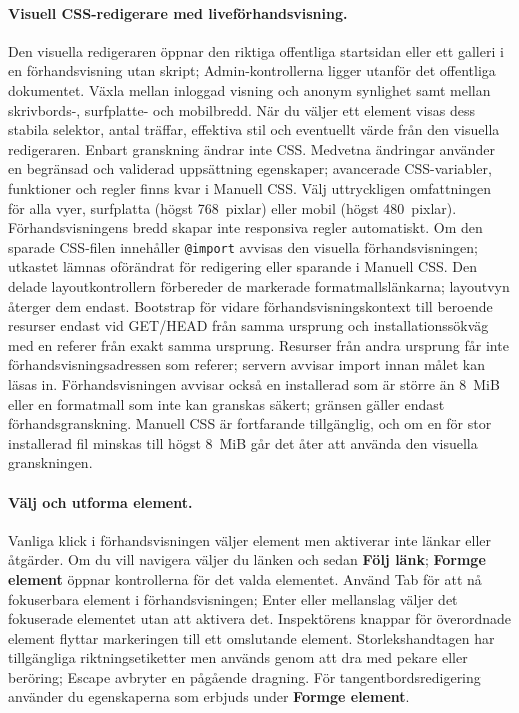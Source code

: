 \documentclass[11pt,a4paper]{article}
\newcommand{\filepath}[1]{\path{#1}}
\newcommand{\ui}[1]{\textbf{#1}}
\newcommand{\codeword}[1]{\nolinkurl{#1}}
\begin{document}
\paragraph{Visuell CSS-redigerare med liveförhandsvisning.} Den visuella
redigeraren öppnar den riktiga offentliga startsidan eller ett galleri i en
förhandsvisning utan skript; Admin-kontrollerna ligger utanför det offentliga
dokumentet. Växla mellan inloggad visning och anonym synlighet samt mellan
skrivbords-, surfplatte- och mobilbredd. När du väljer ett element visas dess
stabila selektor, antal träffar, effektiva stil och eventuellt värde från den
visuella redigeraren. Enbart granskning ändrar inte CSS. Medvetna ändringar
använder en begränsad och validerad uppsättning egenskaper; avancerade
CSS-variabler, funktioner och regler finns kvar i Manuell CSS. Välj uttryckligen
omfattningen för alla vyer, surfplatta (högst 768~pixlar) eller mobil (högst
480~pixlar). Förhandsvisningens bredd skapar inte responsiva regler automatiskt.
Om den sparade CSS-filen innehåller \codeword{@import} avvisas den visuella
förhandsvisningen; utkastet lämnas oförändrat för redigering eller sparande i
Manuell CSS. Den delade layoutkontrollern förbereder de markerade
formatmallslänkarna; layoutvyn återger dem endast. Bootstrap för vidare
förhandsvisningskontext till beroende resurser endast vid GET/HEAD från samma
ursprung och installationssökväg med en referer från exakt samma ursprung.
Resurser från andra ursprung får inte förhandsvisningsadressen som referer;
servern avvisar import innan målet kan läsas in. Förhandsvisningen avvisar också
en installerad \filepath{public/assets/custom.css} som är större än 8~MiB eller
en formatmall som inte kan granskas säkert; gränsen gäller endast
förhandsgranskning. Manuell CSS är fortfarande tillgänglig, och om en för stor
installerad fil minskas till högst 8~MiB går det åter att använda den visuella
granskningen.

\paragraph{Välj och utforma element.} Vanliga klick i förhandsvisningen väljer
element men aktiverar inte länkar eller åtgärder. Om du vill navigera väljer du
länken och sedan \ui{Följ länk}; \ui{Formge element} öppnar kontrollerna för det
valda elementet. Använd Tab för att nå fokuserbara element i förhandsvisningen;
Enter eller mellanslag väljer det fokuserade elementet utan att aktivera det.
Inspektörens knappar för överordnade element flyttar markeringen till ett
omslutande element. Storlekshandtagen har tillgängliga riktningsetiketter men
används genom att dra med pekare eller beröring; Escape avbryter en pågående
dragning. För tangentbordsredigering använder du egenskaperna som erbjuds under
\ui{Formge element}.
\end{document}
